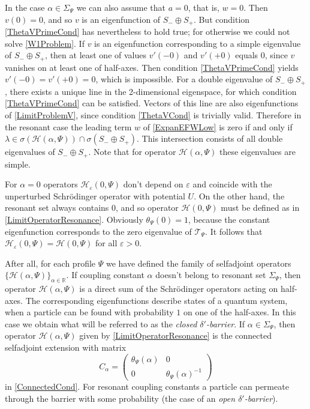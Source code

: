 \documentclass[11pt,english]{amsart}
\begin{document}
\begin{g_remark}\rm \label{RemarkV(0)=0} In the case $\alpha\in \Sigma_\Psi$ we  can also assume that
 $a=0$, that is, $w=0$.  Then $v(0)=0$, and so  $v$ is an eigenfunction of $S_-\oplus S_+$. But condition \eqref{ThetaVPrimeCond}
has  nevertheless to hold true; for otherwise we could not solve \eqref{W1Problem}.
If $v$ is an eigenfunction corresponding to a simple eigenvalue of $S_-\oplus S_+$, then at least one of values $v'(-0)$ and $v'(+0)$ equals $0$, since $v$ vanishes on at least one of half-axes. Then condition  \eqref{ThetaVPrimeCond}
yields $v'(-0)=v'(+0)=0$, which is impossible.
For a double eigenvalue of  $S_-\oplus S_+$, there exists a unique line in the 2-dimensional eigenspace, for which condition \eqref{ThetaVPrimeCond} can be satisfied.
Vectors of this line are also eigenfunctions of \eqref{LimitProblemV}, since condition \eqref{ThetaVCond}
is trivially valid. Therefore in the resonant case  the leading term  $w$ of \eqref{ExpanEFWLow} is zero if and only if  $\lambda\in\sigma(\mathcal{H}(\alpha,\Psi))\cap\sigma(S_-\oplus S_+)$.
This intersection consists of all double eigenvalues of $S_-\oplus S_+$. Note that for operator $\mathcal{H}(\alpha,\Psi)$ these eigenvalues are simple.
\end{g_remark}

\begin{g_remark}\rm For $\alpha=0$ operators $\mathcal{H_{\varepsilon}}(0,\Psi)$ don't depend on $\varepsilon$ and coincide with the unperturbed  Schr\"{o}dinger operator with potential $U$. On the other hand, the resonant set always contains
 $0$, and so operator $\mathcal{H}(0,\Psi)$ must be defined as in \eqref{LimitOperatorResonance}.
Obviously $\theta_\Psi (0)=1$, because the constant eigenfunction corresponds to the zero eigenvalue of
$\mathcal{T}_\Psi$. It follows that  $\mathcal{H_{\varepsilon}}(0,\Psi)=\mathcal{H}(0,\Psi)$ for all $\varepsilon>0$.
\end{g_remark}

After all, for each profile $\Psi$ we have defined the family of selfadjoint operators  $\{\mathcal{H}(\alpha,\Psi)\}_{\alpha\in\mathbb{R}}$.
If coupling constant $\alpha$ doesn't belong to resonant set $\Sigma_\Psi$, then operator
$\mathcal{H}(\alpha,\Psi)$ is a direct sum of the Schr\"{o}dinger operators acting on half-axes. The corresponding eigenfunctions describe  states of a quantum system, when a particle can be found with probability $1$ on one of the half-axes. In this case we obtain what will be referred to as the \emph{closed $\delta'$-barrier}.
 If $\alpha\in \Sigma_\Psi$, then operator $\mathcal{H}(\alpha,\Psi)$ given by \eqref{LimitOperatorResonance} is the  connected  selfadjoint extension with  matrix
\begin{equation}\label{MatrixC}
C_\alpha=\begin{pmatrix} \theta_\Psi (\alpha) & 0 \\ 0 & \theta_\Psi (\alpha)^{-1} \end{pmatrix}
\end{equation}
in \eqref{ConnectedCond}. For resonant coupling constants  a particle can permeate through the barrier with some probability  (the case of an \emph{open $\delta'$-barrier}).
\end{document}
